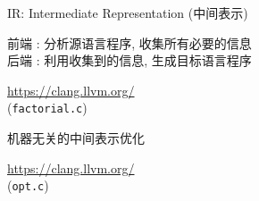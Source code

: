 
\begin{frame}{}
  \begin{center}
    IR: Intermediate Representation (中间表示)
    \vspace{0.50cm}


    \vspace{0.50cm}
    前端 : 分析源语言程序, 收集所有必要的信息 \\[8pt]
    后端 : 利用收集到的信息, 生成目标语言程序
  \end{center}
\end{frame}

\begin{frame}{}
\end{frame}

\begin{frame}{}
  \begin{center}

    \vspace{0.30cm}
    \url{https://clang.llvm.org/}\\[5pt]
    (\texttt{factorial.c})
  \end{center}
\end{frame}

\begin{frame}{}
  \begin{center}

    \vspace{0.50cm}
    机器无关的中间表示优化
  \end{center}
\end{frame}

\begin{frame}{}
  \begin{center}

    \vspace{0.30cm}
    \url{https://clang.llvm.org/}\\[5pt]
    (\texttt{opt.c})
  \end{center}
\end{frame}

